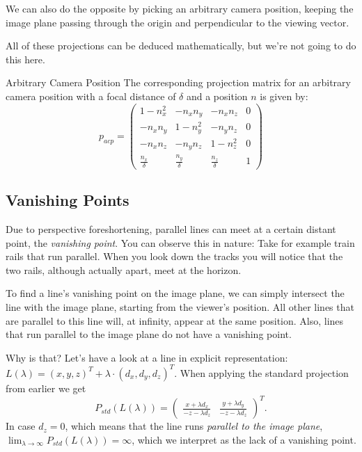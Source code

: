 \documentclass{panikzettel}
\begin{document}
We can also do the opposite by picking an arbitrary camera position, keeping the image plane passing through the origin and perpendicular to the viewing vector.

All of these projections can be deduced mathematically, but we're not going to do this here.

\begin{defi}{Arbitrary Camera Position}
The corresponding projection matrix for an arbitrary camera position with a focal distance of $\delta$ and a position $n$ is given by:$$p_{acp} =
\begin{pmatrix}
1-n_x^2 & -n_xn_y & -n_xn_z & 0 \\
-n_xn_y & 1-n_y^2 & -n_yn_z & 0 \\
-n_xn_z & -n_yn_z & 1-n_z^2 & 0 \\
\frac{n_x}{\delta} & \frac{n_y}{\delta} & \frac{n_z}{\delta} & 1
\end{pmatrix}$$
\end{defi}

\subsection{Vanishing Points}
Due to perspective foreshortening, parallel lines can meet at a certain distant point, the \emph{vanishing point}. You can observe this in nature: Take for example train rails that run parallel. When you look down the tracks you will notice that the two rails, although actually apart, meet at the horizon.

To find a line's vanishing point on the image plane, we can simply intersect the line with the image plane, starting from the viewer's position. All other lines that are parallel to this line will, at infinity, appear at the same position. Also, lines that run parallel to the image plane do not have a vanishing point.

Why is that? Let's have a look at a line in explicit representation: $L(\lambda) = (x, y, z)^T + \lambda \cdot (d_x, d_y, d_z)^T$. When applying the standard projection from earlier we get $$P_{std} (L(\lambda)) = \begin{pmatrix} \frac{x + \lambda d_x}{-z - \lambda d_z} & \frac{y + \lambda d_y}{-z  - \lambda d_z} \end{pmatrix}^T.$$
In case $d_z = 0$, which means that the line runs \emph{parallel to the image plane}, $\lim_{\lambda \to \infty} P_{std} (L(\lambda)) = \infty$, which we interpret as the lack of a vanishing point.
\end{document}
